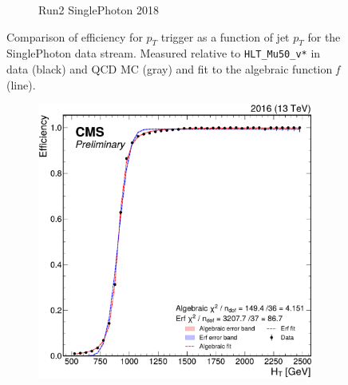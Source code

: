 \begin{figure}
\begin{subfigure}{.45\textwidth}
		\caption{Run2 SinglePhoton 2018}
		\label{fig:HT_eff_SinglePhoton_18}
	\end{subfigure}
	\caption[Comparison of trigger efficiencies for \HT trigger for the signal free region.]{Comparison of efficiency for $p_T$ trigger as a function of  jet $p_T$ for the SinglePhoton data stream. Measured relative to \texttt{HLT\_Mu50\_v*} in data (black) and QCD MC (gray) and fit to the algebraic function \textit{f} (line).}
\end{figure}


\begin{figure}
	\centering
	\begin{subfigure}{.36\linewidth}
		\includegraphics[width=\linewidth]{Images/pdfs/fits_16.pdf}
	\end{subfigure}%
	\begin{subfigure}{.36\linewidth}

\end{subfigure}
\end{figure}
